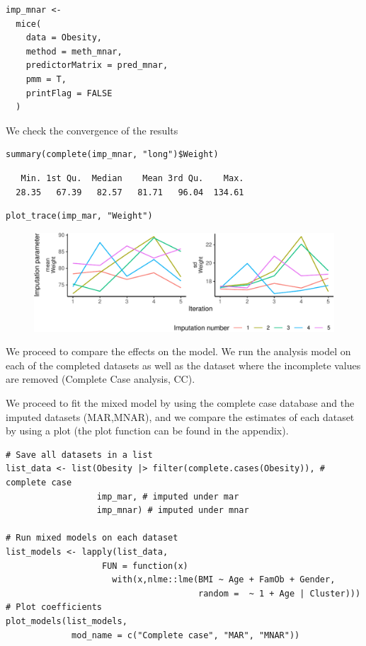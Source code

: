 \documentclass[
  article]{jss}
\begin{document}
\begin{verbatim}
imp_mnar <-
  mice(
    data = Obesity,
    method = meth_mnar,
    predictorMatrix = pred_mnar,
    pmm = T,
    printFlag = FALSE
  )
\end{verbatim}

We check the convergence of the results

\begin{verbatim}
summary(complete(imp_mnar, "long")$Weight)
\end{verbatim}

\begin{verbatim}
   Min. 1st Qu.  Median    Mean 3rd Qu.    Max. 
  28.35   67.39   82.57   81.71   96.04  134.61 
\end{verbatim}

\begin{verbatim}
plot_trace(imp_mar, "Weight")
\end{verbatim}

\begin{figure}[h]

{\centering \includegraphics{manuscript_files/figure-pdf/obesity-predmnarp1-1.pdf}

}

\end{figure}

We proceed to compare the effects on the model. We run the analysis
model on each of the completed datasets as well as the dataset where the
incomplete values are removed (Complete Case analysis, CC).

We proceed to fit the mixed model by using the complete case database
and the imputed datasets (MAR,MNAR), and we compare the estimates of
each dataset by using a plot (the plot function can be found in the
appendix).

\begin{verbatim}
# Save all datasets in a list
list_data <- list(Obesity |> filter(complete.cases(Obesity)), # complete case
                  imp_mar, # imputed under mar
                  imp_mnar) # imputed under mnar

# Run mixed models on each dataset
list_models <- lapply(list_data, 
                   FUN = function(x) 
                     with(x,nlme::lme(BMI ~ Age + FamOb + Gender, 
                                      random =  ~ 1 + Age | Cluster)))
# Plot coefficients
plot_models(list_models,
             mod_name = c("Complete case", "MAR", "MNAR"))
\end{verbatim}
\end{document}
